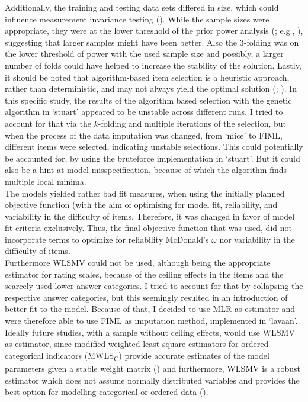 \documentclass[
  12pt,
  a4paper,
  twoside]{article}
\begin{document}
Additionally, the training and testing data sets differed in size, which could influence measurement invariance testing (). While the sample sizes were appropriate, they were at the lower threshold of the prior power analysis (; e.g., ), suggesting that larger samples might have been better. Also the 3-folding was on the lower threshold of power with the used sample size and possibly, a larger number of folds could have helped to increase the stability of the solution. Lastly, it should be noted that algorithm-based item selection is a heuristic approach, rather than deterministic, and may not always yield the optimal solution (; ).
In this specific study, the results of the algorithm based selection with the genetic algorithm in `stuart' appeared to be unstable across different runs.
I tried to account for that via the \(k\)-folding and multiple iterations of the selection, but when the process of the data imputation was changed, from `mice' to FIML, different items were selected, indicating unstable selections.
This could potentially be accounted for, by using the bruteforce implementation in `stuart'.
But it could also be a hint at model misspecification, because of which the algorithm finds multiple local minima.\\
The models yielded rather bad fit measures, when using the initially planned objective function (with the aim of optimising for model fit, reliability, and variability in the difficulty of items.
Therefore, it was changed in favor of model fit criteria exclusively.
Thus, the final objective function that was used, did not incorporate terms to optimize for reliability McDonald's \(\omega\) nor variability in the difficulty of items.\\
Furthermore WLSMV could not be used, although being the appropriate estimator for rating scales, because of the ceiling effects in the items and the scarcely used lower answer categories.
I tried to account for that by collapsing the respective answer categories, but this seemingly resulted in an introduction of better fit to the model. Because of that, I decided to use MLR as estimator and were therefore able to use FIML as imputation method, implemented in `lavaan'.
Ideally future studies, with a sample without ceiling effects, would use WLSMV as estimator, since modified weighted least square estimators for ordered-categorical indicators (MWLS\textsubscript{C}) provide accurate estimates of the model parameters given a stable weight matrix () and furthermore, WLSMV is a robust estimator which does not assume normally distributed variables and provides the best option for modelling categorical or ordered data ().
\end{document}
